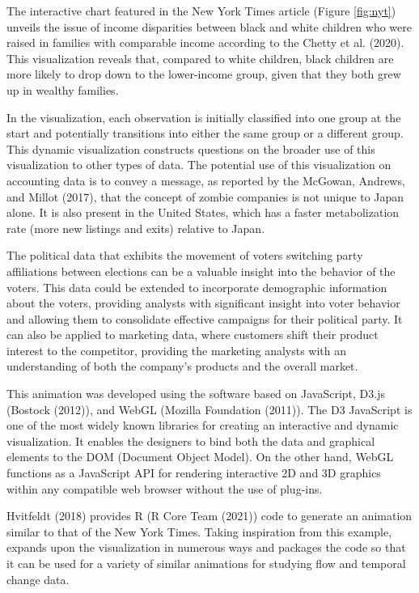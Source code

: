 The interactive chart featured in the New York Times article (Figure \ref{fig:nyt}) unveils the issue of income disparities between black and white children who were raised in families with comparable income according to the Chetty et al. (2020). This visualization reveals that, compared to white children, black children are more likely to drop down to the lower-income group, given that they both grew up in wealthy families.

In the visualization, each observation is initially classified into one group at the start and potentially transitions into either the same group or a different group. This dynamic visualization constructs questions on the broader use of this visualization to other types of data. The potential use of this visualization on accounting data is to convey a message, as reported by the McGowan, Andrews, and Millot (2017), that the concept of zombie companies is not unique to Japan alone. It is also present in the United States, which has a faster metabolization rate (more new listings and exits) relative to Japan.

The political data that exhibits the movement of voters switching party affiliations between elections can be a valuable insight into the behavior of the voters. This data could be extended to incorporate demographic information about the voters, providing analysts with significant insight into voter behavior and allowing them to consolidate effective campaigns for their political party. It can also be applied to marketing data, where customers shift their product interest to the competitor, providing the marketing analysts with an understanding of both the company's products and the overall market.

This animation was developed using the software based on JavaScript, D3.js (Bostock (2012)), and WebGL (Mozilla Foundation (2011)). The D3 JavaScript is one of the most widely known libraries for creating an interactive and dynamic visualization. It enables the designers to bind both the data and graphical elements to the DOM (Document Object Model). On the other hand, WebGL functions as a JavaScript API for rendering interactive 2D and 3D graphics within any compatible web browser without the use of plug-ins.

Hvitfeldt (2018) provides R (R Core Team (2021)) code to generate an animation similar to that of the New York Times. Taking inspiration from this example,  expands upon the visualization in numerous ways and packages the code so that it can be used for a variety of similar animations for studying flow and temporal change data.

